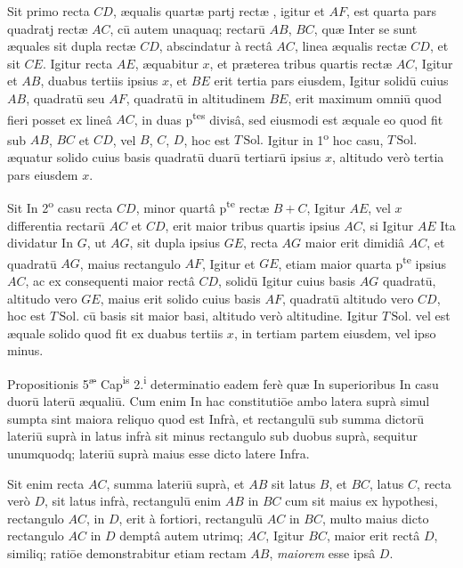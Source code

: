 \documentclass[11pt,a4paper]{article}
\begin{document}
Sit primo recta $CD$, æqualis quartæ partj rectæ , igitur et $AF$, est quarta pars quadratj rectæ $AC$, cū autem unaquaq; rectarū $AB$, $BC$, quæ Inter se sunt æquales sit dupla rectæ $CD$, abscindatur à rectâ $AC$, linea æqualis rectæ $CD$, et sit $CE$. Igitur recta $AE$, æquabitur $x$, et præterea tribus quartis rectæ $AC$, Igitur et $AB$, duabus tertiis ipsius $x$, et $BE$ erit tertia pars eiusdem, Igitur solidū cuius $AB$, quadratū seu $AF$, quadratū in altitudinem $BE$, erit maximum omniū quod fieri posset ex lineâ $AC$, in duas p\textsuperscript{tes} divisâ, sed eiusmodi est æquale eo quod fit sub $AB$, $BC$ et $CD$, vel $B$, $C$, $D$, hoc est $T\,\mathrm{Sol.}$ Igitur in 1\textsuperscript{o} hoc casu, $T\,\mathrm{Sol.}$ æquatur solido cuius basis quadratū duarū tertiarū ipsius $x$, altitudo verò tertia pars eiusdem \struck{\ill{}} $x$.

Sit In 2\textsuperscript{o} casu recta $CD$, minor quartâ p\textsuperscript{te} rectæ $B + C$, Igitur $AE$, vel $x$ differentia rectarū $AC$ et $CD$, erit maior tribus quartis ipsius $AC$, si Igitur $AE$ Ita dividatur In $G$, ut $AG$, sit dupla ipsius $GE$, recta $AG$ maior erit dimidiâ $AC$, et quadratū $AG$, maius rectangulo $AF$, Igitur et $GE$, etiam maior quarta p\textsuperscript{te} ipsius $AC$, ac ex consequenti maior rectâ $CD$, solidū Igitur cuius basis $AG$ quadratū, altitudo vero $GE$, maius erit solido cuius basis $AF$, quadratū altitudo vero $CD$, hoc est $T\,\mathrm{Sol.}$ cū basis sit maior basi, altitudo verò altitudine. Igitur $T\,\mathrm{Sol.}$ vel est æquale solido quod fit ex duabus tertiis $x$, in tertiam partem eiusdem, vel ipso minus.


Propositionis 5\textsuperscript{æ} Cap\textsuperscript{is} 2.\textsuperscript{i} determinatio eadem ferè quæ In superioribus In casu duorū laterū æqualiū. Cum enim In hac constitutiōe ambo latera suprà simul sumpta sint maiora reliquo quod est Infrà, et rectangulū sub summa dictorū lateriū suprà in latus infrà sit minus rectangulo sub duobus suprà, sequitur unumquodq; lateriū suprà maius esse dicto latere Infra.

Sit enim recta $AC$, summa lateriū suprà, et $AB$ sit latus $B$, et $BC$, latus $C$, recta verò $D$, sit latus infrà, rectangulū enim $AB$ in $BC$ cum sit maius ex hypothesi, rectangulo $AC$, in $D$, erit à fortiori, rectangulū $AC$ in $BC$, multo maius dicto rectangulo $AC$ in $D$ demptâ autem utrimq; $AC$, Igitur $BC$, maior erit rectâ $D$, similiq; ratiōe demonstrabitur etiam rectam $AB$, \emph{maiorem} esse ipsâ $D$.
\end{document}

